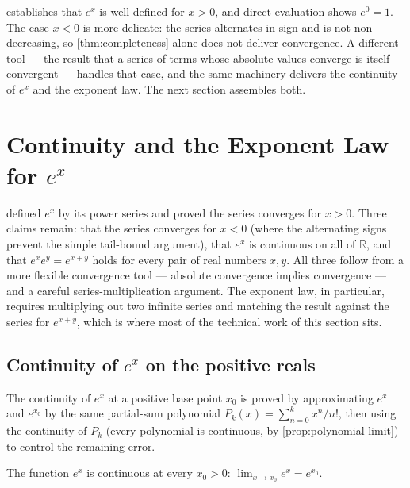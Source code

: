  establishes that \(e^{x}\) is well defined for \(x > 0\), and direct evaluation shows \(e^{0} = 1\). The case \(x < 0\) is more delicate: the series alternates in sign and is not non-decreasing, so \cref{thm:completeness} alone does not deliver convergence. A different tool --- the result that a series of terms whose absolute values converge is itself convergent --- handles that case, and the same machinery delivers the continuity of \(e^{x}\) and the exponent law. The next section assembles both.

\section{Continuity and the Exponent Law for \texorpdfstring{$e^{x}$}{e\^{}x}}\label{sec:continuity-and-exponent-law}

 defined \(e^{x}\) by its power series and proved the series converges for \(x > 0\). Three claims remain: that the series converges for \(x < 0\) (where the alternating signs prevent the simple tail-bound argument), that \(e^{x}\) is continuous on all of \(\mathbb{R}\), and that \(e^{x} e^{y} = e^{x + y}\) holds for every pair of real numbers \(x, y\). All three follow from a more flexible convergence tool --- absolute convergence implies convergence --- and a careful series-multiplication argument. The exponent law, in particular, requires multiplying out two infinite series and matching the result against the series for \(e^{x + y}\), which is where most of the technical work of this section sits.

\subsection{Continuity of \texorpdfstring{$e^{x}$}{e\^{}x} on the positive reals}

The continuity of \(e^{x}\) at a positive base point \(x_{0}\) is proved by approximating \(e^{x}\) and \(e^{x_{0}}\) by the same partial-sum polynomial \(P_{k}(x) = \sum_{n = 0}^{k} x^{n}/n!\), then using the continuity of \(P_{k}\) (every polynomial is continuous, by \cref{prop:polynomial-limit}) to control the remaining error.

\begin{theorem}\label{thm:exp-continuous-positive}
The function \(e^{x}\) is continuous at every \(x_{0} > 0\): \(\lim_{x \to x_{0}} e^{x} = e^{x_{0}}\).
\end{theorem}

